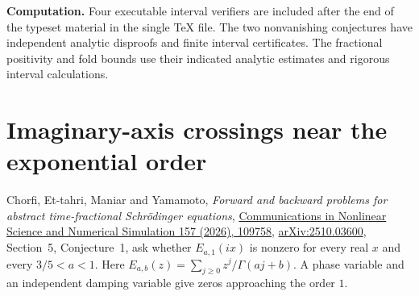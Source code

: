 \documentclass[11pt,a4paper]{article}
\numberwithin{equation}{section}
\begin{document}
\noindent\textbf{Computation.}
Four executable interval verifiers are included after the end of the
typeset material in the single TeX file. The two nonvanishing conjectures have independent analytic disproofs and finite interval certificates. The fractional positivity and fold bounds use
their indicated analytic estimates and rigorous interval calculations.
\clearpage


\section{Imaginary-axis crossings near the exponential order}
\label{sec:imaginary}
Chorfi, Et-tahri, Maniar and Yamamoto, \emph{Forward and backward
problems for abstract time-fractional Schr\"odinger equations},
\href{https://doi.org/10.1016/j.cnsns.2026.109758}{Communications
in Nonlinear Science and Numerical Simulation 157 (2026), 109758},
\href{https://arxiv.org/abs/2510.03600}{arXiv:2510.03600},
Section~5, Conjecture~1, ask whether $E_{a,1}(ix)$ is nonzero for
every real $x$ and every $3/5<a<1$. Here $E_{a,b}(z)=
\sum_{j\ge0}z^j/\Gamma(aj+b)$. A phase variable and an independent
damping variable give zeros approaching the order $1$.
\end{document}
